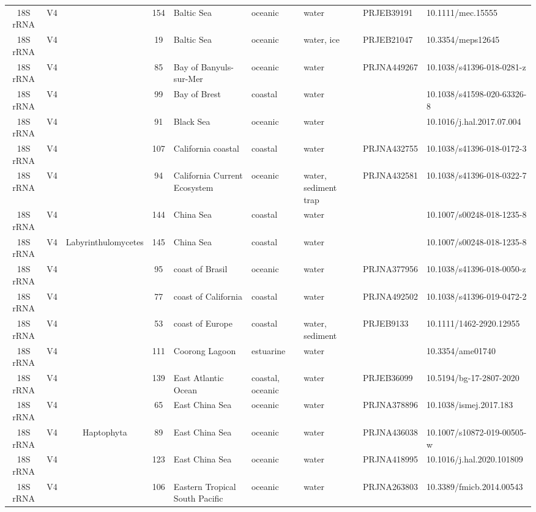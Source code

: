 \begin{longtable}{cccclllll}
  18S rRNA & V4 &  & 154 & Baltic Sea & oceanic & water & PRJEB39191 & 10.1111/mec.15555 \\ 
  18S rRNA & V4 &  & 19 & Baltic Sea & oceanic & water, ice & PRJEB21047 & 10.3354/meps12645 \\ 
  18S rRNA & V4 &  & 85 & Bay of Banyuls-sur-Mer & oceanic & water & PRJNA449267 & 10.1038/s41396-018-0281-z \\ 
  18S rRNA & V4 &  & 99 & Bay of Brest & coastal & water &  & 10.1038/s41598-020-63326-8 \\ 
  18S rRNA & V4 &  & 91 & Black Sea & oceanic & water &  & 10.1016/j.hal.2017.07.004 \\ 
  18S rRNA & V4 &  & 107 & California coastal & coastal & water & PRJNA432755 & 10.1038/s41396-018-0172-3 \\ 
  18S rRNA & V4 &  & 94 & California Current Ecosystem & oceanic & water, sediment trap & PRJNA432581 & 10.1038/s41396-018-0322-7 \\ 
  18S rRNA & V4 &  & 144 & China Sea & coastal & water &  & 10.1007/s00248-018-1235-8 \\ 
  18S rRNA & V4 & Labyrinthulomycetes & 145 & China Sea & coastal & water &  & 10.1007/s00248-018-1235-8 \\ 
  18S rRNA & V4 &  & 95 & coast of Brasil & oceanic & water & PRJNA377956 & 10.1038/s41396-018-0050-z \\ 
  18S rRNA & V4 &  & 77 & coast of California & coastal & water & PRJNA492502 & 10.1038/s41396-019-0472-2 \\ 
  18S rRNA & V4 &  & 53 & coast of Europe & coastal & water, sediment & PRJEB9133 & 10.1111/1462-2920.12955 \\ 
  18S rRNA & V4 &  & 111 & Coorong Lagoon & estuarine & water &  & 10.3354/ame01740 \\ 
  18S rRNA & V4 &  & 139 & East Atlantic Ocean & coastal, oceanic & water & PRJEB36099 & 10.5194/bg-17-2807-2020 \\ 
  18S rRNA & V4 &  & 65 & East China Sea & oceanic & water & PRJNA378896 & 10.1038/ismej.2017.183 \\ 
  18S rRNA & V4 & Haptophyta & 89 & East China Sea & oceanic & water & PRJNA436038 & 10.1007/s10872-019-00505-w \\ 
  18S rRNA & V4 &  & 123 & East China Sea & oceanic & water & PRJNA418995 & 10.1016/j.hal.2020.101809 \\ 
  18S rRNA & V4 &  & 106 & Eastern Tropical South Pacific & oceanic & water & PRJNA263803 & 10.3389/fmicb.2014.00543 \\ 

\end{longtable}
